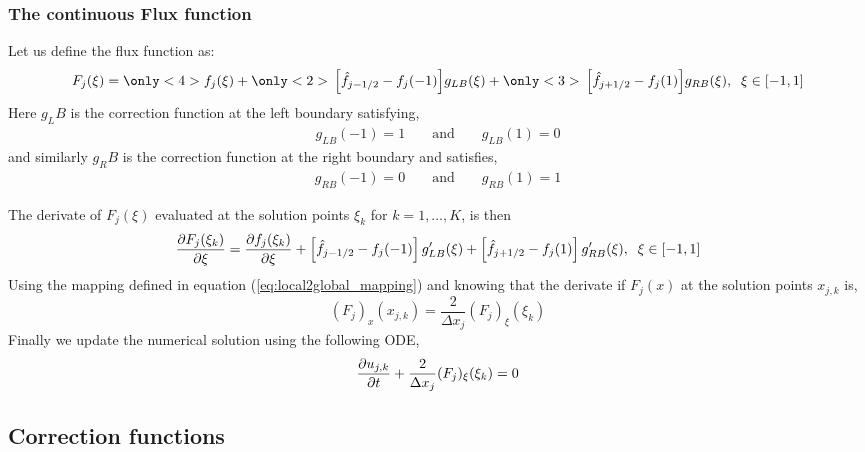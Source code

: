 \begin{frame} \frametitle{The continuous Flux function}
	Let us define the flux function as:
	\begin{equation}
	F_j(\xi) = {\only<4>{\color{red}}f_j(\xi)}+ 
	{\only<2>{\color{blue}} \left[ \hat{f}_{j-1/2} - f_j(-1) \right]} g_{LB}(\xi) +
	{\only<3>{\color{green}}\left[ \hat{f}_{j+1/2} - f_j( 1) \right]} g_{RB}(\xi),
	\;\; \xi \in [-1,1]
	\label{eq:continuous_flux_func}
	\end{equation}
	Here $g_LB$ is the correction function at the left boundary satisfying,
	\begin{align}
	&g_{LB}(-1)=1& &\text{ and }&  &g_{LB}(1)=0&
	\end{align}
	and similarly $g_RB$ is the correction function at the right boundary and satisfies, 
	\begin{align}
	&g_{RB}(-1)=0& &\text{ and }&  &g_{RB}(1)=1&
	\end{align}
\end{frame}

\begin{frame}
	The derivate of $F_j(\xi)$ evaluated at the solution points $\xi_k$ for $k=1,\dots,K$, is then
	\begin{equation}
	\frac{\partial F_j(\xi_k)}{\partial \xi} = \frac{\partial f_j(\xi_k)}{\partial \xi}+ 
	\left[ \hat{f}_{j-1/2} - f_j(-1) \right] g_{LB}^{\prime}(\xi) +
	\left[ \hat{f}_{j+1/2} - f_j( 1) \right] g_{RB}^{\prime}(\xi),
	\;\; \xi \in [-1,1]
	\label{eq:continuous_flux_func}
	\end{equation}		
	Using the mapping defined in equation (\ref{eq:local2global_mapping}) and knowing that the derivate if $F_j(x)$ at the solution points $x_{j,k}$ is,
	\begin{equation}
	(F_j)_x (x_{j,k}) = \frac{2}{\Delta x_j} (F_j)_{\xi}(\xi_k)
	\end{equation}
Finally we update the numerical solution using the following ODE,
	\begin{equation}
	\frac{\partial u_{j,k}}{\partial t}+\frac{2}{\Delta x_j}(F_j)_\xi (\xi_k)=0
	\end{equation}
\end{frame}

\subsection{Correction functions}

